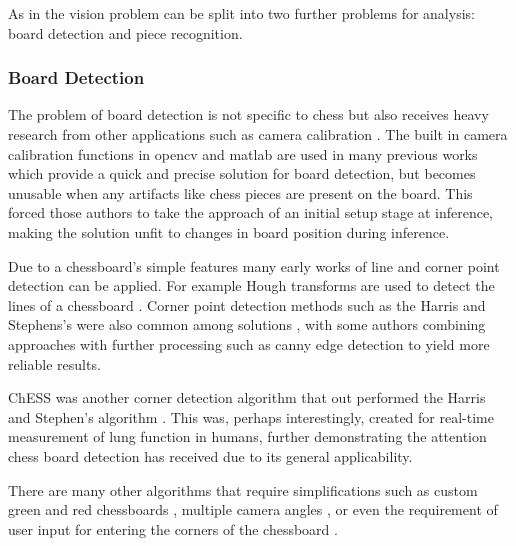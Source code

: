 As in \cite{Ding2016ChessVisionC} the vision problem can be split into two further problems for analysis: board detection and piece recognition.

\subsubsection{Board Detection}
The problem of board detection is not specific to chess but also receives heavy research from other applications such as camera calibration \cite{cameraCalibration}.
The built in camera calibration functions in opencv \cite{opencv_library} and matlab \cite{MATLAB:2010} are used in many previous works \cite{Koray2016ACV, bowers_2014} which
provide a quick and precise solution for board detection, but becomes unusable when any artifacts like chess pieces are present on the board.
This forced those authors to take the approach of an initial setup stage at inference, making the solution unfit to changes in board position during inference.

Due to a chessboard's simple features many early works of line and corner point detection can be applied.  For example Hough
transforms are used to detect the lines of a chessboard \cite{CVChess, nusChessVision}.  Corner point detection methods such as the
Harris and Stephens's \cite{} were also common among solutions \cite{}, with some authors combining approaches with further
processing such as canny edge detection \cite{} to yield more reliable results.

ChESS was another corner detection algorithm that out performed the Harris and Stephen's algorithm \cite{}. This was, perhaps
interestingly, created for real-time measurement of lung function in humans, further demonstrating the attention chess board
detection has received due to its general applicability.

There are many other algorithms that require simplifications such as custom green and red chessboards \cite{}, multiple camera angles \cite{},
or even the requirement of user input for entering the corners of the chessboard \cite{}.

